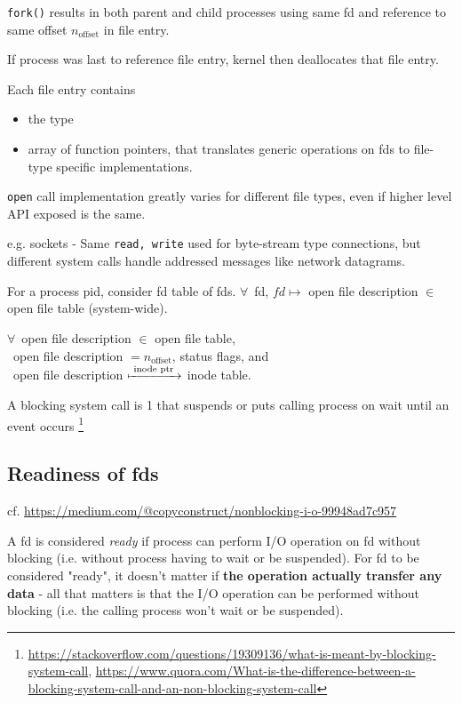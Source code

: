 \documentclass[10pt]{amsart}
\begin{document}
\texttt{fork()} results in both parent and child processes using same fd and reference to same offset $n_{\text{offset}}$ in file entry.

If process was last to reference file entry, kernel then deallocates that file entry.


Each file entry contains
\begin{itemize}
	\item the type
	\item array of function pointers, that translates generic operations on fds to file-type specific implementations.
\end{itemize}

\texttt{open} call implementation greatly varies for different file types, even if higher level API exposed is the same.

e.g. sockets - Same \texttt{read, write} used for byte-stream type connections, but different system calls handle addressed messages like network datagrams.


For a process pid, consider fd table of fds. $\forall \, $ fd, $fd \mapsto $ open file description $\in$ open file table (system-wide).

$\forall \, $ open file description $\in $ open file table, \\
\qquad \, open file description $= n_{\text{offset}}$, status flags, and \\
\qquad \, open file description $\xmapsto{ \text{ inode ptr } }$ inode table.

A blocking system call is 1 that suspends or puts calling process on wait until an event occurs \footnote{\url{https://stackoverflow.com/questions/19309136/what-is-meant-by-blocking-system-call}, \url{https://www.quora.com/What-is-the-difference-between-a-blocking-system-call-and-an-non-blocking-system-call}}

\subsection{Readiness of fds}

cf. \url{https://medium.com/@copyconstruct/nonblocking-i-o-99948ad7c957}

A fd is considered \emph{ready} if process can perform I/O operation on fd without blocking (i.e. without process having to wait or be suspended). For fd to be considered "ready", it doesn't matter if \textbf{the operation actually transfer any data} - all that matters is that the I/O operation can be performed without blocking (i.e. the calling process won't wait or be suspended).
\end{document}

